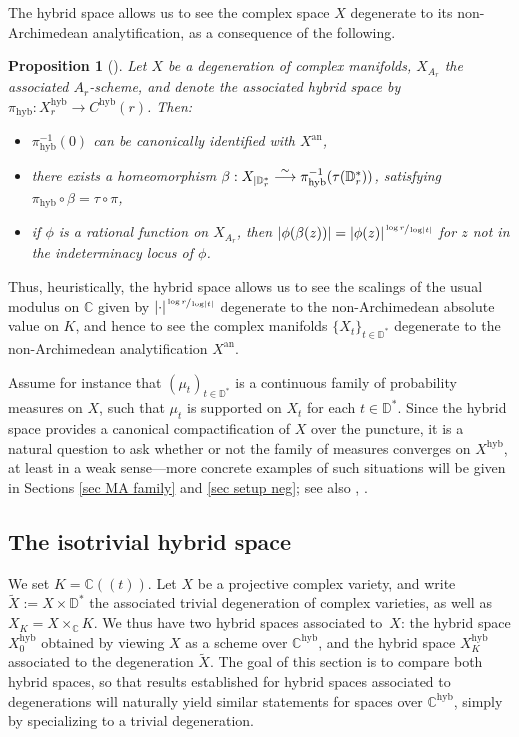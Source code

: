 \documentclass[JEP,XML,SOM,Unicode,published]{cedram}
\newcommand{\To}[1]{\mathchoice{\xrightarrow{\textstyle\kern4pt#1\kern3pt}}{\stackrel{#1}{\longrightarrow}}{}{}}
\newcommand{\lpr}{(\!(}
\newcommand{\rpr}{)\!)}
\newtheorem{prop}[equation]{Proposition}
\theoremstyle{definition}
\newcommand \C{\mathbb C}
\newcommand \D {\mathbb{D}}
\newcommand{\an}{\mathrm{an}}
\newcommand{\hyb}{\mathrm{hyb}}
\begin{document}
The hybrid space allows us to see the complex space $X$ degenerate to its non-Archimedean analytification, as a consequence of the following.\begin{prop}[{\cite[Th.\,1.2]{Fav}}] \label{topo hyb}
Let $X$ be a degeneration of complex \hbox{manifolds}, $X_{A_r}$ the associated $A_r$-scheme, and denote the associated hybrid space by $\pi_{\hyb}: X_r^{\hyb} \to C^{\hyb}(r)$. Then:
\begin{itemize}
\item $\pi_{\hyb}^{-1}(0)$ can be canonically identified with $X^{\an}$,
\item there exists a homeomorphism $\beta: X_{ | \D^*_r} \To{\sim} \pi_{\hyb}^{-1}(\tau(\D^*_r))$, satisfying $\pi_{\hyb} \circ \beta = \tau \circ \pi$,
\item if $\phi$ is a rational function on $X_{A_r}$, then $\lvert \phi (\beta(z)) \rvert = \lvert \phi (z) \rvert^{\sfrac{\log r}{\log \lvert t \rvert}}$ for $z$ not in the indeterminacy locus of $\phi$.
\end{itemize}
\end{prop}
Thus, heuristically, the hybrid space allows us to see the scalings of the usual modulus on $\C$ given by $\lvert \cdot \rvert^{\sfrac{\log r}{\log \lvert t \rvert}}$ degenerate to the non-Archimedean absolute value on $K$, and hence to see the complex manifolds $\{X_t\}_{t \in \D^*}$ degenerate to the non-Archimedean analytification $X^{\an}$.

Assume for instance that $(\mu_t)_{t \in \D^*}$ is a continuous family of probability measures on $X$, such that $\mu_t$ is supported on $X_t$ for each $t \in \D^*$. Since the hybrid space provides a canonical compactification of $X$ over the puncture, it is a natural question to ask whether or not the family of measures converges on $X^{\hyb}$, at least in a weak sense---more concrete examples of such situations will be given in Sections \ref{sec MA family} and \ref{sec setup neg}; see also \cite{Shiv1}, \cite{Shiv2}.
\subsection{The isotrivial hybrid space} \label{sec iso}
We set $K = \C\lpr t\rpr$. Let $X$ be a projective complex variety, and write $\tilde{X}:= X \times \D^*$ the associated trivial degeneration of complex varieties, as well as $X_K = X \times_{\C} K$. We thus have two hybrid spaces associated to~$X$: the hybrid space $X^{\hyb}_0$ obtained by viewing $X$ as a scheme over $\C^{\hyb}$, and the hybrid space $X^{\hyb}_K$ associated to the degeneration $\tilde{X}$. The goal of this section is to compare both hybrid spaces, so that results established for hybrid spaces associated to dege\-nerations will naturally yield similar statements for spaces over $\C^{\hyb}$, simply by specializing to a trivial degeneration.
\end{document}
